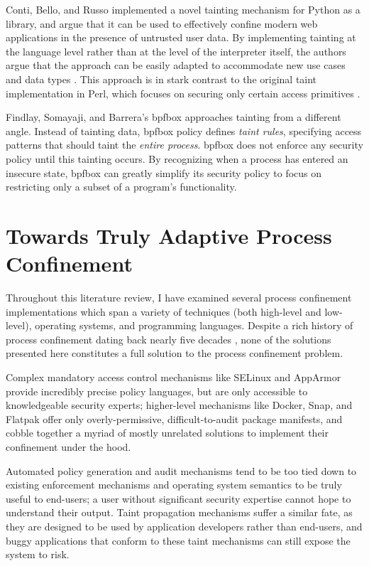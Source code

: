 \documentclass[dvipsnames, 12pt]{article}
\begin{document}
Conti, Bello, and Russo \cite{conti2010_taint,bello2012_taint} implemented
a novel tainting mechanism for Python as a library, and argue that it can be
used to effectively confine modern web applications in the presence of untrusted
user data. By implementing tainting at the language level rather than at the
level of the interpreter itself, the authors argue that the approach can be
easily adapted to accommodate new use cases and data types
\cite{conti2010_taint, bello2012_taint}.  This approach is in stark contrast to
the original taint implementation in Perl, which focuses on securing only
certain access primitives \cite{hurst2004_perl}.


Findlay, Somayaji, and Barrera's bpfbox \cite{findlay20_bpfbox} approaches
tainting from a different angle.  Instead of tainting data, bpfbox policy defines
\textit{taint rules}, specifying access patterns that should taint the \textit{entire process}.
bpfbox does not enforce any security policy until this tainting occurs. By recognizing
when a process has entered an insecure state, bpfbox can greatly simplify its security
policy to focus on restricting only a subset of a program's functionality.

\section{Towards Truly Adaptive Process Confinement}
\label{sec:towards}

Throughout this literature review, I have examined several process confinement
implementations which span a variety of techniques (both high-level and
low-level), operating systems, and programming languages. Despite a rich history
of process confinement dating back nearly five decades
\cite{lampson1973_a_note}, none of the solutions presented here constitutes
a full solution to the process confinement problem.

Complex mandatory access control mechanisms like SELinux
\cite{smalley2001_selinux} and AppArmor \cite{cowan2000_apparmor} provide
incredibly precise policy languages, but are only accessible to knowledgeable
security experts; higher-level mechanisms like Docker, Snap, and Flatpak offer
only overly-permissive, difficult-to-audit package manifests, and cobble together
a myriad of mostly unrelated solutions to implement their confinement under the
hood.

Automated policy generation and audit mechanisms tend to be too tied down to
existing enforcement mechanisms and operating system semantics to be truly
useful to end-users; a user without significant security expertise cannot hope
to understand their output. Taint propagation mechanisms suffer a similar fate,
as they are designed to be used by application developers rather than end-users,
and buggy applications that conform to these taint mechanisms can still expose
the system to risk.
\end{document}
